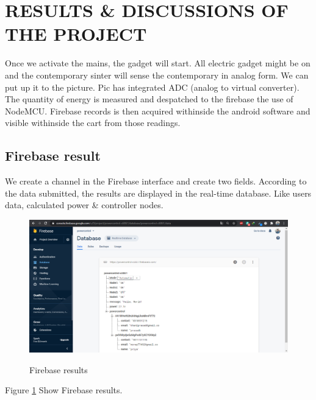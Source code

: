 \documentclass[12pt,a4paper]{article}
\begin{document}

\newpage
\pagebreak
\vspace*{\fill}%
\noindent
{}
\vfill


\newpage
\section{RESULTS \& DISCUSSIONS OF THE PROJECT}
\fancyfoot[R]{\thepage}

\hspace{0.5cm}Once we activate the mains, the gadget will start. All electric gadget might be on and the contemporary sinter will sense the contemporary in analog form. We can put up it to the picture. Pic has integrated ADC (analog to virtual converter). The quantity of energy is measured and despatched to the firebase the use of NodeMCU. Firebase records is then acquired withinside the android software and visible withinside the cart from those readings. \\


\subsection{Firebase result}
\hspace{0.5cm}We create a channel in the Firebase interface and create two fields. According to the data submitted, the results are displayed in the real-time database. Like users data, calculated power \& controller nodes.\\

\begin{figure}[H]
	\centering
	\includegraphics[width=\linewidth]{fbdb1.PNG}\\
	\caption{Firebase results}
	\label{fig:6.1}
\end{figure}
\begin{center}
Figure \ref{fig:6.1} Show Firebase results.
\end{center}
\end{document}

